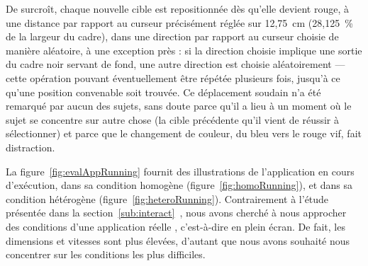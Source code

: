 	De surcroît, chaque nouvelle cible est repositionnée dès qu'elle devient rouge, à une distance par rapport au curseur précisément réglée sur 12,75~cm (28,125~\%{} de la largeur du cadre), dans une direction par rapport au curseur choisie de manière aléatoire, à une exception près : si la direction choisie implique une sortie du cadre noir servant de fond, une autre direction est choisie aléatoirement --- cette opération pouvant éventuellement être répétée plusieurs fois, jusqu'à ce qu'une position convenable soit trouvée. Ce déplacement soudain n'a été remarqué par aucun des sujets, sans doute parce qu'il a lieu à un moment où le sujet se concentre sur autre chose (la cible précédente qu'il vient de réussir à sélectionner) et parce que le changement de couleur, du bleu vers le rouge vif, fait distraction.
	
	La figure~\ref{fig:evalAppRunning} fournit des illustrations de l'application en cours d'exécution, dans sa condition homogène (figure~\ref{fig:homoRunning}), et dans sa condition hétérogène (figure~\ref{fig:heteroRunning}). Contrairement à l'étude présentée dans la section~\ref{sub:interact}~\cite{kouyoumdjian2015characterizing}, nous avons cherché à nous approcher des conditions d'une application \og réelle \fg{}, c'est-à-dire en plein écran. De fait, les dimensions et vitesses sont plus élevées, d'autant que nous avons souhaité nous concentrer sur les conditions les plus difficiles.
	
